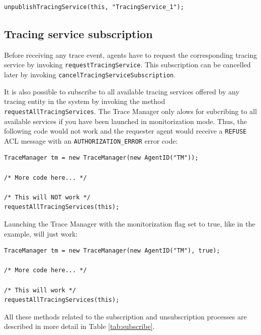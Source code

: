 		\begin{lstlisting}
unpublishTracingService(this, "TracingService_1");
		\end{lstlisting}

		\subsection{Tracing service subscription}\label{sec:subscription}

			Before receiving any trace event, agents have to request the corresponding tracing service
			by invoking \lstinline{requestTracingService}. This subscription can be cancelled later by
			invoking \lstinline{cancelTracingServiceSubscription}.

			It is also possible to subscribe to all available tracing services offered by any tracing entity in
			the system by invoking the method \lstinline{requestAllTracingServices}. The Trace Manager
			only alows for subcribing to all available services if you have been launched in monitorization mode. Thus,
			the following code would not work and the requester agent would receive a \texttt{REFUSE}
			ACL message with an \texttt{AUTHORIZATION\_ERROR} error code:

			\begin{lstlisting}
TraceManager tm = new TraceManager(new AgentID("TM"));

/* More code here... */

/* This will NOT work */
requestAllTracingServices(this);
			\end{lstlisting}

			Launching the Trace Manager with the monitorization flag set to true, like in the example,
			will just work:

			\begin{lstlisting}
TraceManager tm = new TraceManager(new AgentID("TM"), true);

/* More code here... */

/* This will work */
requestAllTracingServices(this);
			\end{lstlisting}

			All these methods related to the subscription and unsubscription processes are described in
			more detail in Table \ref{tab:subscribe}.

